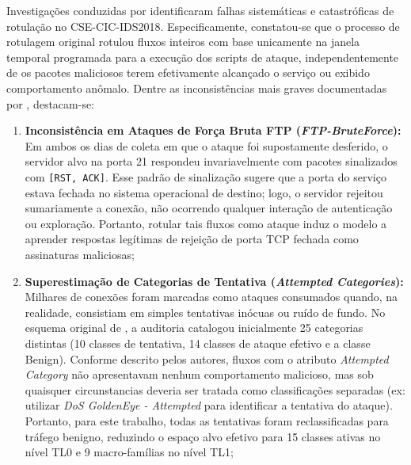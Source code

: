 Investigações conduzidas por  identificaram falhas sistemáticas e catastróficas de 
rotulação no CSE-CIC-IDS2018. Especificamente, constatou-se que o processo de rotulagem original rotulou fluxos 
inteiros com base unicamente na janela temporal programada para a execução dos scripts de ataque, independentemente de 
os pacotes maliciosos terem efetivamente alcançado o serviço ou exibido comportamento anômalo. Dentre as inconsistências
mais graves documentadas por , destacam-se:
\begin{enumerate}
    
    \item \textbf{Inconsistência em Ataques de Força Bruta FTP (\emph{FTP-BruteForce}):} Em ambos os dias de coleta em 
    que o ataque foi supostamente desferido, o servidor alvo na porta 21 respondeu invariavelmente com pacotes 
    sinalizados com \texttt{[RST, ACK]}. Esse padrão de sinalização sugere que a porta do serviço estava fechada no 
    sistema operacional de destino; logo, o servidor rejeitou sumariamente a conexão, não ocorrendo qualquer interação 
    de autenticação ou exploração. Portanto, rotular tais fluxos como ataque induz o modelo a aprender respostas 
    legítimas de rejeição de porta TCP fechada como assinaturas maliciosas;
    
    \item \textbf{Superestimação de Categorias de Tentativa (\emph{Attempted Categories}):} Milhares de conexões foram 
    marcadas como ataques consumados quando, na realidade, consistiam em simples tentativas inócuas ou ruído de fundo. 
    No esquema original de , a auditoria catalogou inicialmente 25 categorias distintas (10 
    classes de tentativa, 14 classes de ataque efetivo e a classe Benign). 
    Conforme descrito pelos autores, fluxos com o atributo \emph{Attempted Category} não apresentavam nenhum 
    comportamento malicioso, mas sob quaisquer circunstancias deveria ser tratada como classificações separadas (ex: 
    utilizar \emph{DoS GoldenEye - Attempted} para identificar a tentativa do ataque). Portanto, para este trabalho,
    todas as tentativas foram reclassificadas para tráfego benigno, reduzindo o espaço alvo efetivo para 15 classes 
    ativas no nível TL0 e 9 macro-famílias no nível TL1;
    

\end{enumerate}
